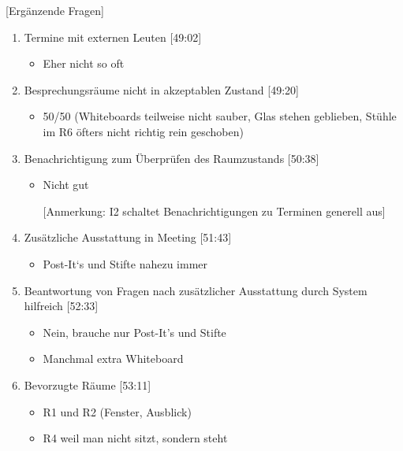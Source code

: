 [Ergänzende Fragen]

\begin{enumerate}
        
    \item Termine mit externen Leuten [49:02]
     \begin{itemize}
        \item Eher nicht so oft
    \end{itemize}
    
    \item Besprechungsräume nicht in akzeptablen Zustand [49:20]
    \begin{itemize}
        \item 50/50 (Whiteboards teilweise nicht sauber, Glas stehen geblieben, Stühle im R6 öfters nicht richtig rein geschoben)
    \end{itemize}

    \item Benachrichtigung zum Überprüfen des Raumzustands [50:38]
     \begin{itemize}
        \item Nicht gut
        \item[] [Anmerkung: I2 schaltet Benachrichtigungen zu Terminen generell aus]
    \end{itemize}
    
    \item Zusätzliche Ausstattung in Meeting [51:43]
     \begin{itemize}
        \item Post-It‘s und Stifte nahezu immer
    \end{itemize}

    \item Beantwortung von Fragen nach zusätzlicher Ausstattung durch System hilfreich [52:33]
     \begin{itemize}
        \item Nein, brauche nur Post-It’s und Stifte
        \item Manchmal extra Whiteboard
    \end{itemize}
        
    \item Bevorzugte Räume [53:11]
     \begin{itemize}
        \item R1 und R2 (Fenster, Ausblick)
        \item R4 weil man nicht sitzt, sondern steht
    \end{itemize}
    

\end{enumerate}
